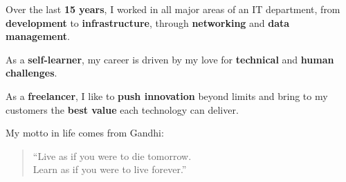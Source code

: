 
Over the last \textbf{15 years}, I worked in all major areas of an IT
department, from \textbf{development} to \textbf{infrastructure}, through
\textbf{networking} and \textbf{data management}.\\

\medskip

As a \textbf{self-learner}, my career is driven
by my love for \textbf{technical} and \textbf{human challenges}.\\

\medskip

As a \textbf{freelancer}, I like to \textbf{push innovation} beyond limits and
bring to my customers the \textbf{best value} each technology can deliver.\\

\medskip

My motto in life comes from Gandhi:\\

\medskip

\begin{quote}
``Live as if you were to die tomorrow.\\
Learn as if you were to live forever.''
\end{quote}

\medskip









\divider


